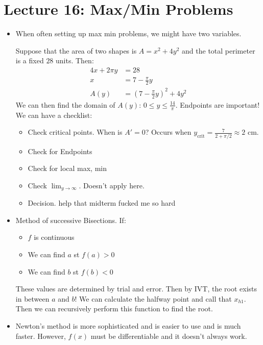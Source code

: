 \section{Lecture 16: Max/Min Problems}
\begin{itemize}
    \item When often setting up max min problems, we might have two variables.
    \begin{example}
        Suppose that the area of two shapes is $A=x^2+4y^2$ and the total perimeter is a fixed $28$ units. Then:
        \begin{align}
            4x+2\pi y &= 28 \\
            x &= 7 - \frac{\pi}{2}y \\ 
            A(y) &= \left(7-\frac{\pi}{2}y\right)^2+4y^2
        \end{align}
        We can then find the domain of $A(y)$: $0 \le y \le \frac{14}{\pi}$. Endpoints are important! We can have a checklist:
        \begin{itemize}
            \item Check critical points. When is $A'=0$? Occurs when $y_\text{crit} = \frac{7}{2+\pi/2} \approx 2\text{ cm}.$
            \item Check for Endpoints
            \item Check for local max, min
            \item Check $\lim_{y\to\infty}$. Doesn't apply here.
            \item Decision. \small{help that midterm fucked me so hard}
        \end{itemize}
    \end{example}
    \item Method of successive Bisections. If:
    \begin{itemize}
        \item $f$ is continuous
        \item We can find $a$ st $f(a)>0$
        \item We can find $b$ st $f(b)<0$
    \end{itemize}
    These values are determined by trial and error. Then by IVT, the root exists in between $a$ and $b$! We can calculate the halfway point and call that $x_{h1}$. Then we can recursively perform this function to find the root.
    \item Newton's method is more sophisticated and is easier to use and is much faster. However, $f(x)$ must be differentiable and it doesn't always work.
    \begin{itemize}

\end{itemize}
\end{itemize}
